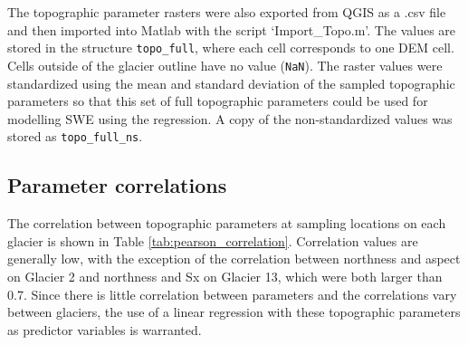 \documentclass[12pt]{article}
\begin{document}
The topographic parameter rasters were also exported from QGIS as a .csv file and then imported into Matlab with the script `Import\_Topo.m'. The values are stored in the structure \texttt{topo\_full}, where each cell corresponds to one DEM cell. Cells outside of the glacier outline have no value (\texttt{NaN}). The raster values were standardized using the mean and standard deviation of the sampled topographic parameters so that this set of full topographic parameters could be used for modelling SWE using the regression. A copy of the non-standardized values was stored as \texttt{topo\_full\_ns}.

\subsection{Parameter correlations}

The correlation between topographic parameters at sampling locations on each glacier is shown in Table \ref{tab:pearson_correlation}. Correlation values are generally low, with the exception of the correlation between northness and aspect on Glacier 2 and northness and Sx on Glacier 13, which were both larger than 0.7. Since there is little correlation between parameters and the correlations vary between glaciers, the use of a linear regression with these topographic parameters as predictor variables is warranted. 
\end{document}
